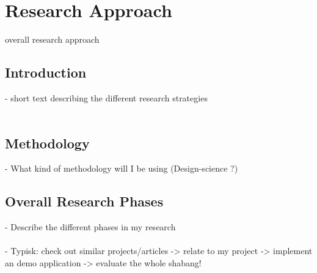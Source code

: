 \chapter{Research Approach}

overall research approach

\section{Introduction}

- short text describing the different research strategies
\\\\

\section{Methodology}

- What kind of methodology will I be using (Design-science ?)

\section{Overall Research Phases}

- Describe the different phases in my research
\\\\
- Typisk: check out similar projects/articles -> relate to my project -> implement an demo application -> evaluate the whole shabang!

